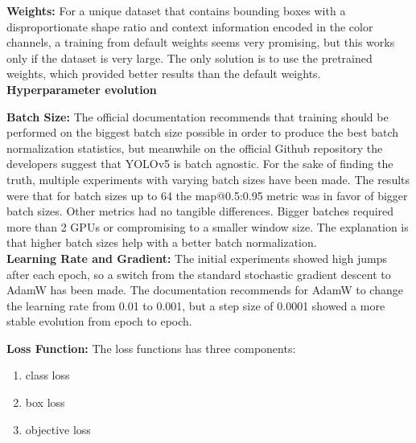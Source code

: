 
\textbf{Weights:}
For a unique dataset that contains bounding boxes with a disproportionate shape ratio and context information encoded in the color channels, a training from default weights seems very promising, but this works only if the dataset is very large. The only solution is to use the pretrained weights, which provided better results than the default weights.  \\

\textbf{Hyperparameter evolution}

\textbf{Batch Size:}
The official documentation recommends that training should be performed on the biggest batch size possible in order to produce the best batch normalization statistics, but meanwhile on the official Github repository the developers suggest that YOLOv5 is batch agnostic. For the sake of finding the truth, multiple experiments with varying batch sizes have been made. The results were that for batch sizes up to 64 the map@0.5:0.95 metric was in favor of bigger batch sizes. Other metrics had no tangible differences. Bigger batches required more than 2 GPUs or compromising to a smaller window size.
The explanation is that higher batch sizes help with a better batch normalization. \\

\textbf{Learning Rate and Gradient:}
The initial experiments showed high jumps after each epoch, so a switch from the standard stochastic gradient descent to AdamW has been made. The documentation recommends for AdamW to change the learning rate from 0.01 to 0.001, but a step size of 0.0001 showed a more stable evolution from epoch to epoch.

\textbf{Loss Function:}
The loss functions has three components:
\begin{enumerate}
  \item class loss
  \item box loss
  \item objective loss
\end{enumerate}


